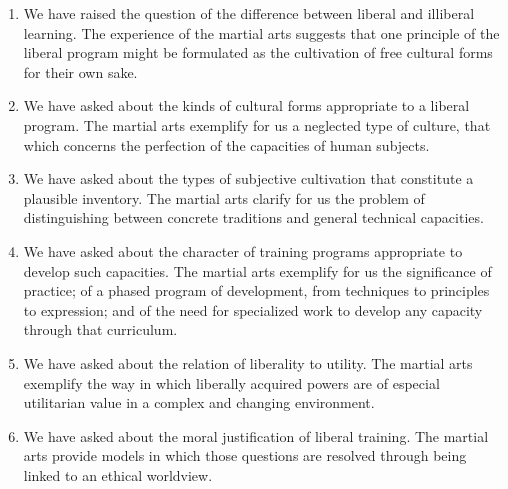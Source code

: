 \begin{enumerate}
\item We have raised the question of the difference between liberal and illiberal learning. The experience of the martial arts suggests that one principle of the liberal program might be formulated as the cultivation of free cultural forms for their own sake.
\item We have asked about the kinds of cultural forms appropriate to a liberal program. The martial arts exemplify for us a neglected type of culture, that which concerns the perfection of the capacities of human subjects.
\item We have asked about the types of subjective cultivation that constitute a plausible inventory. The martial arts clarify for us the problem of distinguishing between concrete traditions and general technical capacities. 
\item We have asked about the character of training programs appropriate to develop such capacities. The martial arts exemplify for us the significance of practice; of a phased program of development, from techniques to principles to expression; and of the need for specialized work to develop any capacity through that curriculum. 
\item We have asked about the relation of liberality to utility. The martial arts exemplify the way in which liberally acquired powers are of especial utilitarian value in a complex and changing environment. 
\item We have asked about the moral justification of liberal training. The martial arts provide models in which those questions are resolved through being linked to an ethical worldview. 
\end{enumerate}